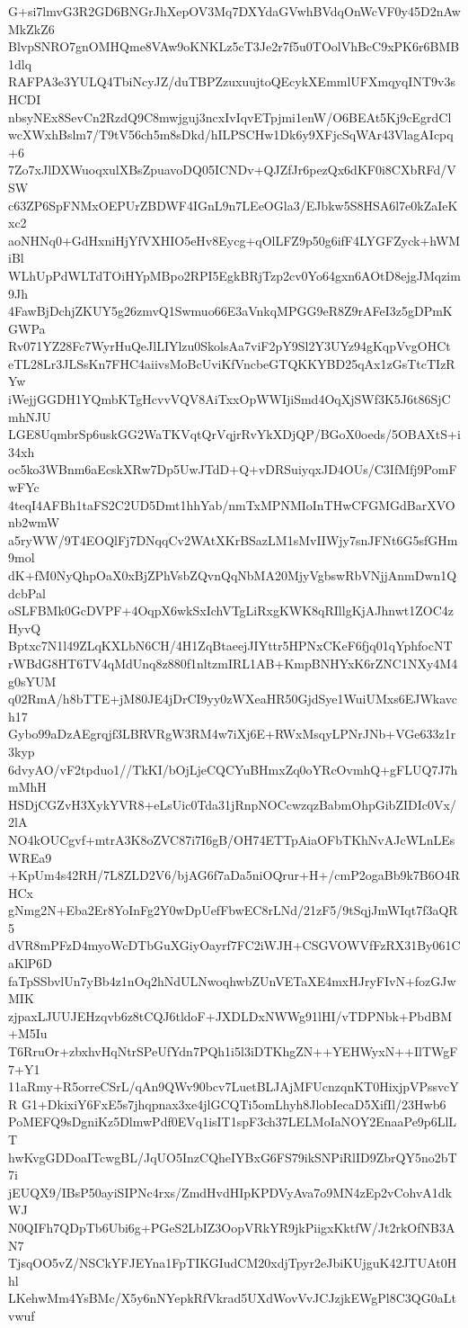 G+si7lmvG3R2GD6BNGrJhXepOV3Mq7DXYdaGVwhBVdqOnWcVF0y45D2nAwMkZkZ6
BlvpSNRO7gnOMHQme8VAw9oKNKLz5cT3Je2r7f5u0TOolVhBcC9xPK6r6BMB1dlq
RAFPA3e3YULQ4TbiNcyJZ/duTBPZzuxuujtoQEcykXEmmlUFXmqyqINT9v3sHCDI
nbsyNEx8SevCn2RzdQ9C8mwjguj3ncxIvIqvETpjmi1enW/O6BEAt5Kj9cEgrdCl
wcXWxhBslm7/T9tV56ch5m8sDkd/hILPSCHw1Dk6y9XFjcSqWAr43VlagAIcpq+6
7Zo7xJlDXWuoqxulXBsZpuavoDQ05ICNDv+QJZfJr6pezQx6dKF0i8CXbRFd/VSW
c63ZP6SpFNMxOEPUrZBDWF4IGnL9n7LEeOGla3/EJbkw5S8HSA6l7e0kZaIeKxc2
aoNHNq0+GdHxniHjYfVXHIO5eHv8Eycg+qOlLFZ9p50g6ifF4LYGFZyck+hWMiBl
WLhUpPdWLTdTOiHYpMBpo2RPI5EgkBRjTzp2cv0Yo64gxn6AOtD8ejgJMqzim9Jh
4FawBjDchjZKUY5g26zmvQ1Swmuo66E3aVnkqMPGG9eR8Z9rAFeI3z5gDPmKGWPa
Rv071YZ28Fc7WyrHuQeJlLIYlzu0SkolsAa7viF2pY9Sl2Y3UYz94gKqpVvgOHCt
eTL28Lr3JLSsKn7FHC4aiivsMoBcUviKfVncbeGTQKKYBD25qAx1zGsTtcTIzRYw
iWejjGGDH1YQmbKTgHcvvVQV8AiTxxOpWWIjiSmd4OqXjSWf3K5J6t86SjCmhNJU
LGE8UqmbrSp6uskGG2WaTKVqtQrVqjrRvYkXDjQP/BGoX0oeds/5OBAXtS+i34xh
oc5ko3WBnm6aEcskXRw7Dp5UwJTdD+Q+vDRSuiyqxJD4OUs/C3IfMfj9PomFwFYc
4teqI4AFBh1taFS2C2UD5Dmt1hhYab/nmTxMPNMIoInTHwCFGMGdBarXVOnb2wmW
a5ryWW/9T4EOQlFj7DNqqCv2WAtXKrBSazLM1sMvIIWjy7snJFNt6G5sfGHm9mol
dK+fM0NyQhpOaX0xBjZPhVsbZQvnQqNbMA20MjyVgbswRbVNjjAnmDwn1QdcbPal
oSLFBMk0GcDVPF+4OqpX6wkSxIchVTgLiRxgKWK8qRIllgKjAJhnwt1ZOC4zHyvQ
Bptxc7N1l49ZLqKXLbN6CH/4H1ZqBtaeejJIYttr5HPNxCKeF6fjq01qYphfocNT
rWBdG8HT6TV4qMdUnq8z880f1nltzmIRL1AB+KmpBNHYxK6rZNC1NXy4M4g0sYUM
q02RmA/h8bTTE+jM80JE4jDrCI9yy0zWXeaHR50GjdSye1WuiUMxs6EJWkavch17
Gybo99aDzAEgrqjf3LBRVRgW3RM4w7iXj6E+RWxMsqyLPNrJNb+VGe633z1r3kyp
6dvyAO/vF2tpduo1//TkKI/bOjLjeCQCYuBHmxZq0oYRcOvmhQ+gFLUQ7J7hmMhH
HSDjCGZvH3XykYVR8+eLsUic0Tda31jRnpNOCcwzqzBabmOhpGibZIDIc0Vx/2lA
NO4kOUCgvf+mtrA3K8oZVC87i7I6gB/OH74ETTpAiaOFbTKhNvAJcWLnLEsWREa9
+KpUm4s42RH/7L8ZLD2V6/bjAG6f7aDa5niOQrur+H+/cmP2ogaBb9k7B6O4RHCx
gNmg2N+Eba2Er8YoInFg2Y0wDpUefFbwEC8rLNd/21zF5/9tSqjJmWIqt7f3aQR5
dVR8mPFzD4myoWcDTbGuXGiyOayrf7FC2iWJH+CSGVOWVfFzRX31By061CaKlP6D
faTpSSbvlUn7yBb4z1nOq2hNdULNwoqhwbZUnVETaXE4mxHJryFIvN+fozGJwMIK
zjpaxLJUUJEHzqvb6z8tCQJ6tldoF+JXDLDxNWWg91lHI/vTDPNbk+PbdBM+M5Iu
T6RruOr+zbxhvHqNtrSPeUfYdn7PQh1i5l3iDTKhgZN++YEHWyxN++IlTWgF7+Y1
11aRmy+R5orreCSrL/qAn9QWv90bcv7LuetBLJAjMFUcnzqnKT0HixjpVPssvcYR
G1+DkixiY6FxE5s7jhqpnax3xe4jlGCQTi5omLhyh8JlobIecaD5XifIl/23Hwb6
PoMEFQ9sDgniKz5DlmwPdf0EVq1isIT1spF3ch37LELMoIaNOY2EnaaPe9p6LlLT
hwKvgGDDoaITcwgBL/JqUO5InzCQheIYBxG6FS79ikSNPiRlID9ZbrQY5no2bT7i
jEUQX9/IBsP50ayiSIPNc4rxs/ZmdHvdHIpKPDVyAva7o9MN4zEp2vCohvA1dkWJ
N0QIFh7QDpTb6Ubi6g+PGeS2LbIZ3OopVRkYR9jkPiigxKktfW/Jt2rkOfNB3AN7
TjsqOO5vZ/NSCkYFJEYna1FpTIKGIudCM20xdjTpyr2eJbiKUjguK42JTUAt0Hhl
LKehwMm4YsBMc/X5y6nNYepkRfVkrad5UXdWovVvJCJzjkEWgPl8C3QG0aLtvwuf
